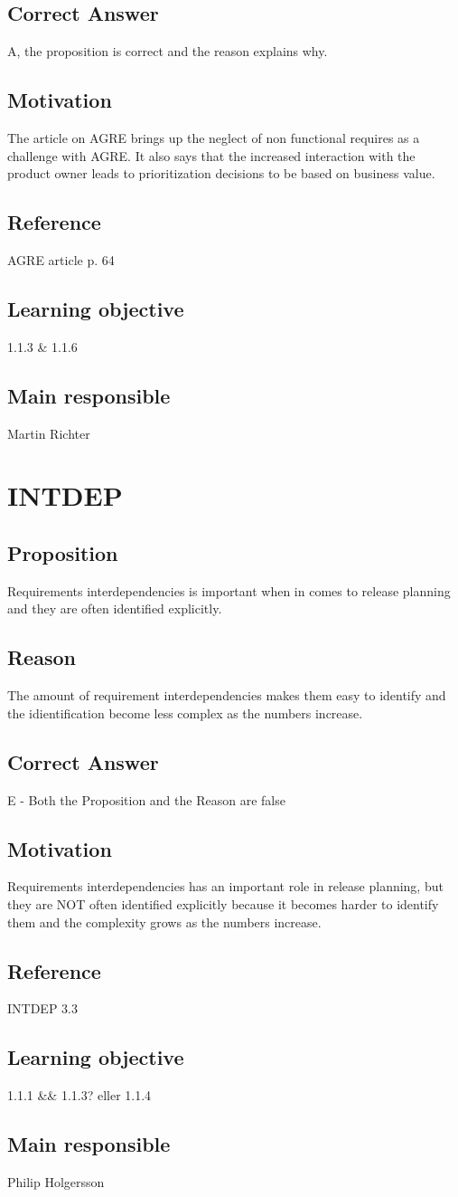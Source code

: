 \documentclass[a4paper]{article}
\begin{document}
\subsection*{Correct Answer}
A, the proposition is correct and the reason explains why.
\subsection*{Motivation}
The article on AGRE brings up the neglect of non functional requires as a challenge with AGRE. It also says that the increased interaction with the product owner leads to prioritization decisions to be based on business value.
\subsection*{Reference}
AGRE article p. 64
\subsection*{Learning objective}
1.1.3 \& 1.1.6
\subsection*{Main responsible}
Martin Richter

\section{INTDEP}
\subsection*{Proposition}
Requirements interdependencies is important when in comes to release planning and they are often identified explicitly.
\subsection*{Reason}
The amount of requirement interdependencies makes them easy to identify and the idientification become less complex as the numbers increase.
\subsection*{Correct Answer}
E - Both the Proposition and the Reason are false
\subsection*{Motivation}
Requirements interdependencies has an important role in release planning, but they are NOT often identified explicitly because it becomes harder to identify them and the complexity grows as the numbers increase.
\subsection*{Reference}
INTDEP 3.3
\subsection*{Learning objective}
1.1.1 \&\& 1.1.3? eller 1.1.4
\subsection*{Main responsible}
Philip Holgersson
\end{document}
